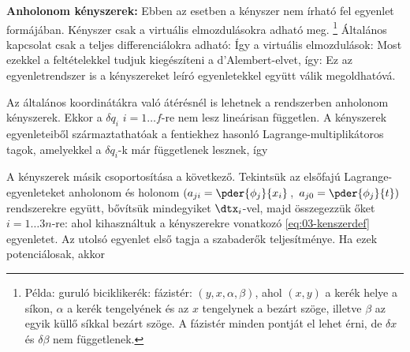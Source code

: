    {\bf Anholonom kényszerek:}
   Ebben az esetben a kényszer nem írható fel  egyenlet formájában.
   Kényszer csak a virtuális elmozdulásokra adható meg.
   \footnote{Példa: guruló biciklikerék: fázistér: $(y,x,\alpha,\beta)$, ahol $(x,y)$ a kerék helye a síkon, $\alpha$ a kerék tengelyének és az $x$ tengelynek a bezárt szöge, illetve $\beta$ az egyik küllő síkkal bezárt szöge.
   A fázistér minden pontját el lehet érni, de $\delta x$ és $\delta \beta$ nem függetlenek. }
   Általános kapcsolat csak a teljes differenciálokra adható:
   Így a virtuális elmozdulások:
   Most ezekkel a feltételekkel tudjuk kiegészíteni a d'Alembert-elvet, így:
   Ez az egyenletrendszer is a kényszereket leíró egyenletekkel együtt válik megoldhatóvá.
   
   Az általános koordinátákra való átérésnél is lehetnek a rendszerben anholonom kényszerek.
   Ekkor a $\delta q_i$ $i=1\dots f$-re nem lesz lineárisan független.
   A kényszerek egyenleteiből származtathatóak a fentiekhez hasonló Lagrange-multiplikátoros tagok, amelyekkel a $\delta q_i$-k már függetlenek lesznek, így

   A kényszerek másik csoportosítása a következő.
   Tekintsük az elsőfajú Lagrange-egyenleteket anholonom és holonom $\left(a_{ji}=\pder{\phi_j}{x_i}\right.$, $\left.a_{j0}=\pder{\phi_j}{t}\right)$ rendszerekre együtt, bővítsük mindegyiket $\dtx_i$-vel, majd összegezzük őket  $i=1\dots 3n$-re:
   ahol kihasználtuk a kényszerekre vonatkozó \eqref{eq:03-kenszerdef} egyenletet.
   Az utolsó egyenlet első tagja a szabaderők teljesítménye.
   Ha ezek potenciálosak, akkor 
   
